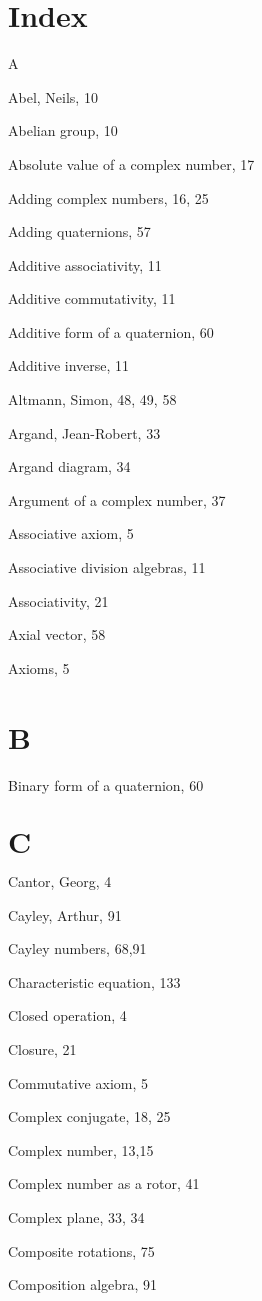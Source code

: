 \section{Index}
A

Abel, Neils, 10

Abelian group, 10

Absolute value of a complex number, 17

Adding complex numbers, 16, 25

Adding quaternions, 57

Additive associativity, 11

Additive commutativity, 11

Additive form of a quaternion, 60

Additive inverse, 11

Altmann, Simon, 48, 49, 58

Argand, Jean-Robert, 33

Argand diagram, 34

Argument of a complex number, 37

Associative axiom, 5

Associative division algebras, 11

Associativity, 21

Axial vector, 58

Axioms, 5

\section{B}
Binary form of a quaternion, 60

\section{$\mathbf{C}$}
Cantor, Georg, 4

Cayley, Arthur, 91

Cayley numbers, 68,91

Characteristic equation, 133

Closed operation, 4

Closure, 21

Commutative axiom, 5

Complex conjugate, 18, 25

Complex number, 13,15

Complex number as a rotor, 41

Complex plane, 33, 34

Composite rotations, 75

Composition algebra, 91

